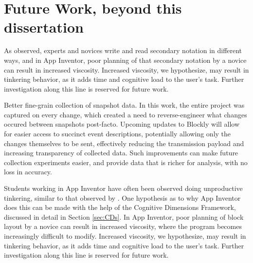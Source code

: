  \section{Future Work, beyond this dissertation} %
\label{sec:futurework}


As \citet{petre-2006} observed, experts and novices write and read secondary notation in different ways, and in App Inventor, poor planning of that secondary notation by a novice can result in increased viscosity. Increased viscosity, we hypothesize, may result in tinkering behavior, as it adds time and cognitive load to the user's task. Further investigation along this line is reserved for future work.

Better fine-grain collection of snapshot data. In this work, the entire project was captured on every change, which created a need to reverse-engineer what changes occured between snapshots post-facto. Upcoming updates to Blockly will allow for easier access to succinct event descriptions, potentially allowing only the changes themselves to be sent, effectively reducing the transmission payload and increasing transparency of collected data. Such improvements can make future collection experiments easier, and provide data that is richer for analysis, with no loss in accuracy. 

Students working in App Inventor have often been observed doing unproductive tinkering, similar to that observed by \citet{perkins-1986}. One hypothesis as to why App Inventor does this can be made with the help of the Cognitive Dimensions Framework, discussed in detail in Section \ref{sec:CDs}. In App Inventor, poor planning of block layout by a novice can result in increased viscosity, where the program becomes increasingly difficult to modify. Increased viscosity, we hypothesize, may result in tinkering behavior, as it adds time and cognitive load to the user's task. Further investigation along this line is reserved for future work.

